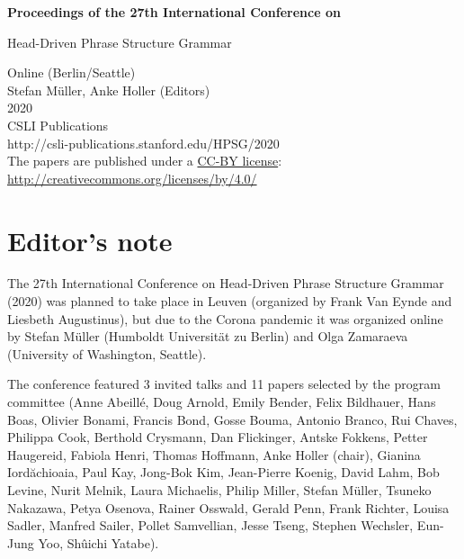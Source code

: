 \documentclass[11pt,a4paper,fleqn]{article}
\begin{document}
\begin{center}
{\Large
                {\bfseries Proceedings of the 27th International Conference on\par Head-Driven Phrase Structure Grammar\par}

                \vspace{8ex}

                     Online (Berlin/Seattle)\\[\baselineskip]

                        Stefan  M{\"u}ller, Anke Holler (Editors)\\[\baselineskip]

                                2020\\[\baselineskip]

                          CSLI Publications\\[\baselineskip]

              http://csli-publications.stanford.edu/HPSG/2020 \\[4\baselineskip]

The papers are published under a \href{http://creativecommons.org/licenses/by/4.0/}{CC-BY license}:\\[3pt]
\href{http://creativecommons.org/licenses/by/4.0/}{http://creativecommons.org/licenses/by/4.0/}
}
\end{center}
\newpage
\tableofcontents

\newpage

\section*{Editor's note}
The 27th International Conference on Head-Driven Phrase Structure Grammar (2020) was planned to take
place in Leuven (organized by Frank Van Eynde and Liesbeth Augustinus), but due to the Corona
pandemic it was organized online by Stefan Müller (Humboldt Universität zu Berlin) and Olga
Zamaraeva (University of Washington, Seattle).


The conference featured 3 invited talks and 11 papers selected by the program committee 
(Anne Abeillé, 
    Doug Arnold,
    Emily Bender,
    Felix Bildhauer,
    Hans Boas,
    Olivier Bonami,
    Francis Bond, 
    Gosse Bouma, 
    Antonio Branco, 
    Rui Chaves, 
    Philippa Cook, 
    Berthold Crysmann,
    Dan Flickinger, 
    Antske Fokkens, 
    Petter Haugereid, 
    Fabiola Henri, 
    Thomas Hoffmann, 
    Anke Holler (chair),
    Gianina Iordăchioaia,
    Paul Kay, 
    Jong-Bok Kim, 
    Jean-Pierre Koenig, 
    David Lahm, 
    Bob Levine, 
    Nurit Melnik, 
    Laura Michaelis, 
    Philip Miller, 
    Stefan Müller, 
    Tsuneko Nakazawa, 
    Petya Osenova, 
    Rainer Osswald, 
    Gerald Penn, 
    Frank Richter, 
    Louisa Sadler, 
    Manfred Sailer, 
    Pollet Samvellian, 
    Jesse Tseng, 
    Stephen Wechsler, 
    Eun-Jung Yoo, 
    Shûichi Yatabe).
\end{document}
